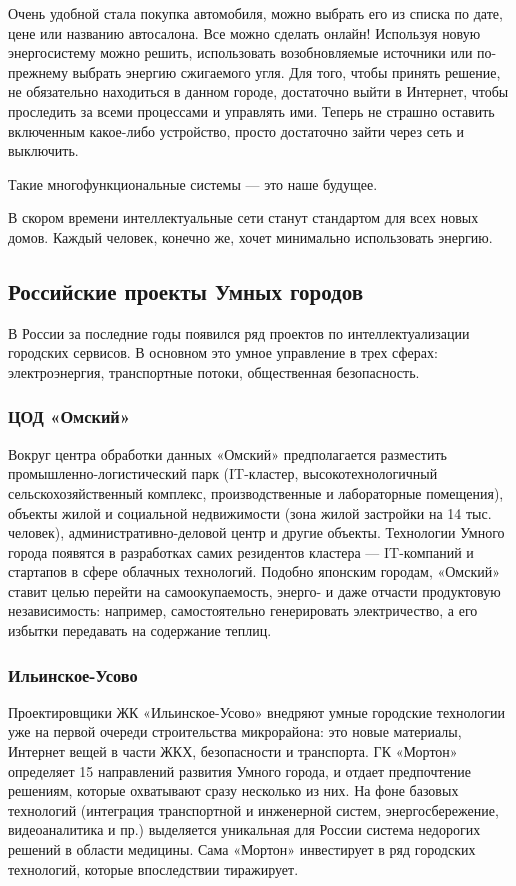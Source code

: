 Очень удобной стала покупка автомобиля, можно выбрать его из списка по дате, цене или названию автосалона. Все можно сделать онлайн! Используя новую энергосистему можно решить, использовать возобновляемые источники или по-прежнему выбрать энергию сжигаемого угля. Для того, чтобы принять решение, не обязательно находиться в данном городе, достаточно выйти в Интернет, чтобы проследить за всеми процессами и управлять ими. Теперь не страшно оставить включенным какое-либо устройство, просто достаточно зайти через сеть и выключить. 

Такие многофункциональные системы --- это наше будущее. 

В скором времени интеллектуальные сети станут стандартом для всех новых домов. Каждый человек, конечно же, хочет минимально использовать энергию.

\subsection{Российские проекты Умных городов}
В России за последние годы появился ряд проектов по интеллектуализации городских сервисов. В основном это умное управление в трех сферах: электроэнергия, транспортные потоки, общественная безопасность.\cite{smartcity}
\subsubsection{ЦОД «Омский»}
Вокруг центра обработки данных «Омский» предполагается разместить промышленно-логистический парк (IT-кластер, высокотехнологичный сельскохозяйственный комплекс, производственные и лабораторные помещения), объекты жилой и социальной недвижимости (зона жилой застройки на 14 тыс. человек), административно-деловой центр и другие объекты. Технологии Умного города появятся в разработках самих резидентов кластера --- IT-компаний и стартапов в сфере облачных технологий. Подобно японским городам, «Омский» ставит целью перейти на самоокупаемость, энерго- и даже отчасти продуктовую независимость: например, самостоятельно генерировать электричество, а его избытки передавать на содержание теплиц.
\subsubsection{Ильинское-Усово}
Проектировщики ЖК «Ильинское-Усово» внедряют умные городские технологии уже на первой очереди строительства микрорайона: это новые материалы, Интернет вещей в части ЖКХ, безопасности и транспорта. ГК «Мортон» определяет 15 направлений развития Умного города, и отдает предпочтение решениям, которые охватывают сразу несколько из них. На фоне базовых технологий (интеграция транспортной и инженерной систем, энергосбережение, видеоаналитика и пр.) выделяется уникальная для России система недорогих решений в области медицины. Сама «Мортон» инвестирует в ряд городских технологий, которые впоследствии тиражирует.
